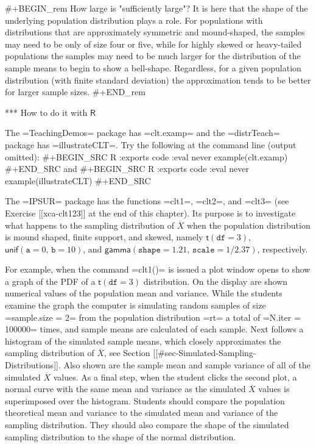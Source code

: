 #+BEGIN_rem
How large is "sufficiently large"? It is here that the shape of the
underlying population distribution plays a role. For populations with
distributions that are approximately symmetric and mound-shaped, the
samples may need to be only of size four or five, while for highly
skewed or heavy-tailed populations the samples may need to be much
larger for the distribution of the sample means to begin to show a
bell-shape. Regardless, for a given population distribution (with
finite standard deviation) the approximation tends to be better for
larger sample sizes.
#+END_rem

*** How to do it with \(\mathsf{R}\)

The =TeachingDemos= package \cite{TeachingDemos} has =clt.examp= and
the =distrTeach= \cite{distrTeach} package has =illustrateCLT=. Try
the following at the command line (output omitted):
#+BEGIN_SRC R :exports code :eval never
example(clt.examp)
#+END_SRC
and
#+BEGIN_SRC R :exports code :eval never
example(illustrateCLT)
#+END_SRC

The =IPSUR= package \cite{IPSUR} has the functions =clt1=, =clt2=, and
=clt3= (see Exercise [[xca-clt123]] at the end of this chapter). Its purpose
is to investigate what happens to the sampling distribution of
\(\overline{X}\) when the population distribution is mound shaped,
finite support, and skewed, namely \(\mathsf{t}(\mathtt{df}=3)\),
\(\mathsf{unif}(\mathtt{a}=0,\,\mathtt{b}=10)\), and
\(\mathsf{gamma}(\mathtt{shape}=1.21,\,\mathtt{scale}=1/2.37)\),
respectively.

For example, when the command =clt1()= is issued a plot window opens
to show a graph of the PDF of a \(\mathsf{t}(\mathtt{df}=3)\)
distribution. On the display are shown numerical values of the
population mean and variance. While the students examine the graph the
computer is simulating random samples of size =sample.size = 2= from
the population distribution =rt= a total of =N.iter = 100000= times,
and sample means are calculated of each sample. Next follows a
histogram of the simulated sample means, which closely approximates
the sampling distribution of \(\overline{X}\), see Section
[[#sec-Simulated-Sampling-Distributions]]. Also shown are the sample
mean and sample variance of all of the simulated \( \overline{X} \)
values. As a final step, when the student clicks the second plot, a
normal curve with the same mean and variance as the simulated \(
\overline{X} \) values is superimposed over the histogram. Students
should compare the population theoretical mean and variance to the
simulated mean and variance of the sampling distribution. They should
also compare the shape of the simulated sampling distribution to the
shape of the normal distribution.

